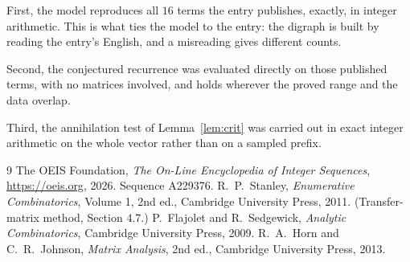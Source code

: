 \documentclass[11pt,a4paper]{article}
\theoremstyle{plain}
\theoremstyle{definition}
\begin{document}
First, the model reproduces all $16$ terms the entry publishes, exactly, in integer
arithmetic. This is what ties the model to the entry: the digraph is built by reading the
entry's English, and a misreading gives different counts.

Second, the conjectured recurrence was evaluated directly on those published terms, with no
matrices involved, and holds wherever the proved range and the data overlap.

Third, the annihilation test of Lemma~\ref{lem:crit} was carried out in exact integer
arithmetic on the whole vector rather than on a sampled prefix.

\begin{thebibliography}{9}
 The OEIS Foundation, \emph{The On-Line Encyclopedia of Integer
Sequences}, \url{https://oeis.org}, 2026. Sequence A229376.
 R.~P.~Stanley, \emph{Enumerative Combinatorics}, Volume 1, 2nd ed.,
Cambridge University Press, 2011. (Transfer-matrix method, Section 4.7.)
 P.~Flajolet and R.~Sedgewick, \emph{Analytic Combinatorics}, Cambridge
University Press, 2009.
 R.~A.~Horn and C.~R.~Johnson, \emph{Matrix Analysis}, 2nd ed., Cambridge
University Press, 2013.
\end{thebibliography}
\end{document}

